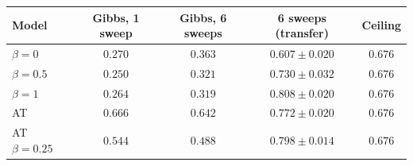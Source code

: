 \begin{tabular}{lcccc}
\toprule
Model & Gibbs, 1 sweep & Gibbs, 6 sweeps & 6 sweeps (transfer) & Ceiling \\
\midrule
$\beta=0$ & $0.270$ & $0.363$ & $0.607 \pm 0.020$ & $0.676$ \\
$\beta=0.5$ & $0.250$ & $0.321$ & $0.730 \pm 0.032$ & $0.676$ \\
$\beta=1$ & $0.264$ & $0.319$ & $0.808 \pm 0.020$ & $0.676$ \\
AT & $\mathbf{0.666}$ & $\mathbf{0.642}$ & $0.772 \pm 0.020$ & $0.676$ \\
AT $\beta=0.25$ & $0.544$ & $0.488$ & $0.798 \pm 0.014$ & $0.676$ \\
\bottomrule
\end{tabular}
